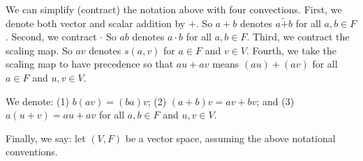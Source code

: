 We can simplify (contract) the notation above with four convections.
First, we denote both vector
and scalar addition by $+$.
So $a + b$ denotes $a \tilde{+} b$
for all $a, b \in F$.
Second,
we contract $\cdot$
So $ab$ denotes $a \cdot b$
for all $a, b \in F$.
Third, we
contract the scaling map.
So $av$ denotes $s(a, v)$
for $a \in F$ and $v \in V$.
Fourth,
we take the scaling
map to have precedence so that
$au + av$ means $(au) + (av)$
for all $a \in F$ and $u,v \in V$.

We denote:
(1)
$b(av) = (ba)v$;
(2)
$(a+b)v = av + bv$;
and (3)
$a(u + v) = au + av$
for all
$a,b \in F$ and $u, v \in V$.

Finally, we say: let $(V, F)$
be a vector space, assuming the
above notational conventions.
\strats
